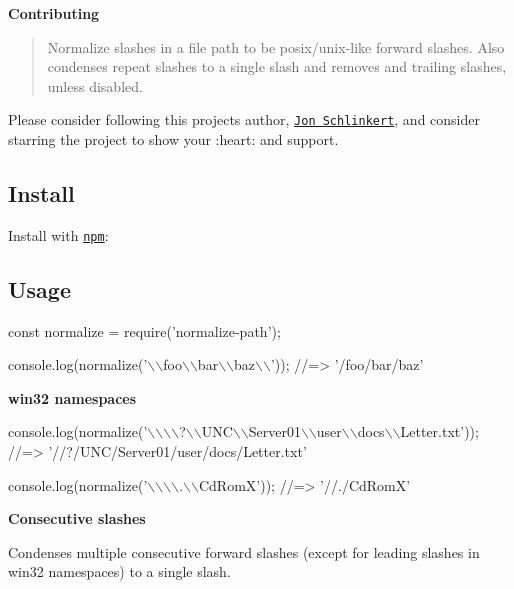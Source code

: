 {\bfseries Contributing}

\begin{quote}
Normalize slashes in a file path to be posix/unix-\/like forward slashes. Also condenses repeat slashes to a single slash and removes and trailing slashes, unless disabled. \end{quote}


Please consider following this project\textquotesingle{}s author, \href{https://github.com/jonschlinkert}{\tt Jon Schlinkert}, and consider starring the project to show your \+:heart\+: and support.

\subsection*{Install}

Install with \href{https://www.npmjs.com/}{\tt npm}\+:




\subsection*{Usage}


\begin{DoxyCode}
const normalize = require('normalize-path');

console.log(normalize('\(\backslash\)\(\backslash\)foo\(\backslash\)\(\backslash\)bar\(\backslash\)\(\backslash\)baz\(\backslash\)\(\backslash\)')); 
//=> '/foo/bar/baz'
\end{DoxyCode}


{\bfseries win32 namespaces}


\begin{DoxyCode}
console.log(normalize('\(\backslash\)\(\backslash\)\(\backslash\)\(\backslash\)?\(\backslash\)\(\backslash\)UNC\(\backslash\)\(\backslash\)Server01\(\backslash\)\(\backslash\)user\(\backslash\)\(\backslash\)docs\(\backslash\)\(\backslash\)Letter.txt')); 
//=> '//?/UNC/Server01/user/docs/Letter.txt'

console.log(normalize('\(\backslash\)\(\backslash\)\(\backslash\)\(\backslash\).\(\backslash\)\(\backslash\)CdRomX')); 
//=> '//./CdRomX'
\end{DoxyCode}


{\bfseries Consecutive slashes}

Condenses multiple consecutive forward slashes (except for leading slashes in win32 namespaces) to a single slash.


